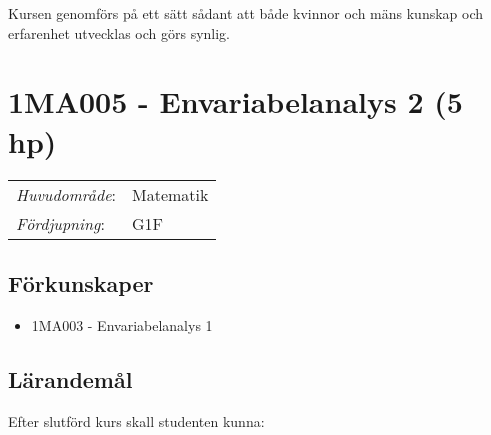Kursen genomförs på ett sätt sådant att både kvinnor och mäns kunskap och erfarenhet utvecklas och görs synlig.
\pagebreak
\section*{1MA005 - Envariabelanalys 2 (5 hp)}

\begin{tabular}{ll}\emph{Huvudområde}: & Matematik\tabularnewline\emph{Fördjupning}: & G1F\tabularnewline\end{tabular}

\subsection*{Förkunskaper}

\begin{itemize}
\tightlist
\item
  1MA003 - Envariabelanalys 1
\end{itemize}

\subsection*{Lärandemål}

Efter slutförd kurs skall studenten kunna:

